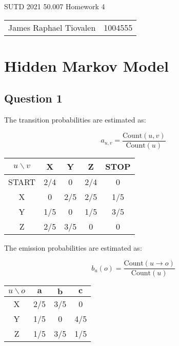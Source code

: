 \documentclass[11pt,fancychapters]{article}
\begin{document}
\centerline{\huge{SUTD 2021 50.007 Homework 4}}

\begin{table}[ht]
\centering
\footnotesize
 \begin{tabular}{c c} 
James Raphael Tiovalen & 1004555
 \end{tabular}
\end{table}

\section*{Hidden Markov Model}

\subsection*{Question 1}

The transition probabilities are estimated as:

\begin{equation*}
	a_{u,v} = \frac{\text{Count}(u, v)}{\text{Count}(u)}
\end{equation*}

\begin{table}[h!]
	\centering
	\begin{tabular}{|c | c | c | c | c |} 
		\hline
		$u \backslash v$ & X & Y & Z & STOP \\
		\hline
		START & 2/4 & 0 & 2/4 & 0 \\
		\hline
		X & 0 & 2/5 & 2/5 & 1/5 \\
		\hline
		Y & 1/5 & 0 & 1/5 & 3/5 \\
		\hline
		Z & 2/5 & 3/5 & 0 & 0 \\ [1ex] 
		\hline
	\end{tabular}
\end{table}

The emission probabilities are estimated as:

\begin{equation*}
	b_{u}(o) = \frac{\text{Count}(u \rightarrow o)}{\text{Count}(u)}
\end{equation*}

\begin{table}[h!]
	\centering
	\begin{tabular}{|c | c | c | c |} 
		\hline
		$u \backslash o$ & $\textbf{a}$ & $\textbf{b}$ & $\textbf{c}$ \\
		\hline
		X & 2/5 & 3/5 & 0 \\
		\hline
		Y & 1/5 & 0 & 4/5 \\
		\hline
		Z & 1/5 & 3/5 & 1/5 \\ [1ex] 
		\hline
	\end{tabular}
\end{table}
\end{document}
